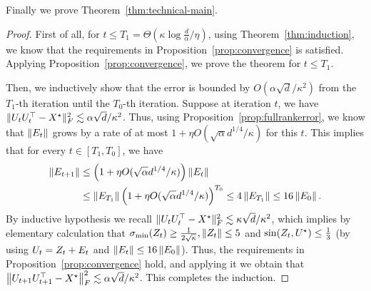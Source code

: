 \noindent Finally we prove Theorem~\ref{thm:technical-main}. 
\begin{proof}
		First of all, for $t \leq T_1 = \Theta(\kappa \log \frac{d}{\alpha} / \eta)$, using Theorem~\ref{thm:induction}, we know that the requirements in  Proposition~\ref{prop:convergence} is satisfied. Applying Proposition~\ref{prop:convergence}, we prove the theorem for $t \leq T_1$. 

Then, we inductively show that the error is bounded by $O(\alpha \sqrt d / \kappa^2)$ from the $T_1$-th iteration  until the $T_0$-th iteration.
Suppose at iteration $t$, we have $\| {U}_t {U}_t^{\top} - {X}^\star \|_F^2 \lesssim \alpha \sqrt d / \kappa^2$.
Thus, using Proposition~\ref{prop:fullrankerror}, we know that $\|E_t\|$ grows by a rate of at most $1 + \eta O(\sqrt{\alpha} d^{1/4} / \kappa)$ for this $t $.
This implies that for every $t \in [T_1, T_0]$, we have
\begin{align*}
	\left\| E_{t  + 1} \right\|  & \leq \left( 1 + \eta O(\sqrt{\alpha} d^{1/4} / \kappa) \right) \left\|E_t\right\| \\
	& \leq \left\|E_{T_1}\right\| \left(1 + \eta O(\sqrt{\alpha} d^{1/4} /\kappa)\right)^{T_0} \leq 4 \left\|E_{T_1}\right\| \leq 16 \left\|E_{0}\right\|.
\end{align*}
By inductive hypothesis we recall $\| {U}_t {U}_t^{\top} - {X}^\star \|_F^2 \lesssim \kappa \sqrt d / \kappa^2$, which implies by elementary calculation that $\sigma_{\min}({Z}_t) \geq \frac{1}{2 \sqrt{\kappa}}, \left\|Z_t \right\| \leq 5$ and $\sin(Z_t, {{U}^\star}) \leq \frac{1}{3}$ (by using ${U}_t = {Z}_t + {E}_t$ and $\left\|E_t\right\| \leq 16 \left\|E_{0}\right\|$). Thus, the requirements in Proposition~\ref{prop:convergence} hold, and applying it we obtain that $\left\|U_{t+1}U_{t+1}^\top- {X}^\star\right\|_F^2\lesssim \alpha \sqrt d / \kappa^2$. This completes the induction. 
\end{proof}



